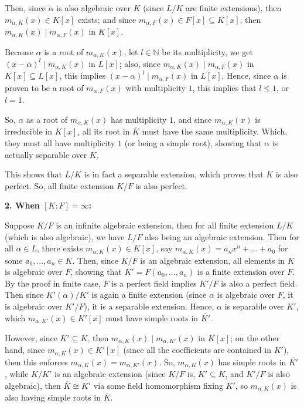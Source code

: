 \documentclass{article}
\begin{document}
\hfil

Then, since $\alpha$ is also algebraic over $K$ (since $L/K$ are finite extensions), then $m_{\alpha, K}(x)\in K[x]$ exists; and since $m_{\alpha,F}(x)\in F[x]\subseteq K[x]$, then $m_{\alpha,K}(x)\mid m_{\alpha,F}(x)$ in $K[x]$.

Because $\alpha$ is a root of $m_{\alpha,K}(x)$, let $l\in \mathbb{N}$ be its multiplicity, we get $(x-\alpha)^l\mid m_{\alpha,K}(x)$ in $L[x]$; also, since $m_{\alpha,K}(x)\mid m_{\alpha,F}(x)$ in $K[x]\subseteq L[x]$, this implies $(x-\alpha)^l\mid m_{\alpha,F}(x)$ in $L[x]$. Hence, since $\alpha$ is proven to be a root of $m_{\alpha,F}(x)$ with multiplicity $1$, this implies that $l\leq 1$, or $l=1$.

So, $\alpha$ as a root of $m_{\alpha,K}(x)$ has multiplicity $1$, and since $m_{\alpha,K}(x)$ is irreducible in $K[x]$, all its root in $\overline{K}$ must have the same multiplicity. Which, they must all have multiplicity $1$ (or being a simple root), showing that $\alpha$ is actually separable over $K$.

This shows that $L/K$ is in fact a separable extension, which proves that $K$ is also perfect. So, all finite extension $K/F$ is also perfect.

\hfil

\textbf{2. When $[K:F]=\infty$:}

Suppose $K/F$ is an infinite algebraic extension, then for all finite extension $L/K$ (which is also algebraic), we have $L/F$ also being an algebraic extension. Then for all $\alpha \in L$, there exists $m_{\alpha,K}(x)\in K[x]$, say $m_{\alpha,K}(x)=a_nx^n+...+a_0$ for some $a_0,...,a_n\in K$. Then, since $K/F$ is an algebraic extension, all elements in $K$ is algebraic over $F$, showing that $K'=F(a_0,...,a_n)$ is a finite extension over $F$. By the proof in finite case, $F$ is a perfect field implies $K'/F$ is also a perfect field. Then since $K'(\alpha)/K'$ is again a finite extension (since $\alpha$ is algebraic over $F$, it is algebraic over $K'/F$), it is a separable extension. Hence, $\alpha$ is separable over $K'$, which $m_{\alpha,K'}(x)\in K'[x]$ must have simple roots in $\overline{K'}$.

However, since $K'\subseteq K$, then $m_{\alpha,K}(x)\mid m_{\alpha,K'}(x)$ in $K[x]$; on the other hand, since $m_{\alpha,K}(x)\in K'[x]$ (since all the coefficients are contained in $K'$), then this enforces $m_{\alpha,K}(x) = m_{\alpha,K'}(x)$. So, $m_{\alpha,K}(x)$ has simple roots in $\overline{K'}$, while $K/K'$ is an algebraic extension (since $K/F$ is, $K'\subseteq K$, and $K'/F$ is also algebraic), then $\overline{K}\cong \overline{K'}$ via some field homomorphism fixing $K'$, so $m_{\alpha,K}(x)$ is also having simple roots in $\overline{K}$.
\end{document}
